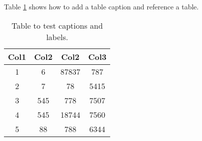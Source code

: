 \documentclass{article}
\begin{document}
	Table \ref{table:data} shows how to add a table caption and reference a table.
	\begin{table}[h!]
		\centering
		\begin{tabular}{||c c c c||} 
			\hline
			Col1 & Col2 & Col2 & Col3 \\ [0.5ex] 
			\hline\hline
			1 & 6 & 87837 & 787 \\ 
			2 & 7 & 78 & 5415 \\
			3 & 545 & 778 & 7507 \\
			4 & 545 & 18744 & 7560 \\
			5 & 88 & 788 & 6344 \\ [1ex] 
			\hline
		\end{tabular}
		\caption{Table to test captions and labels.}
		\label{table:data}
	\end{table}
\end{document}
